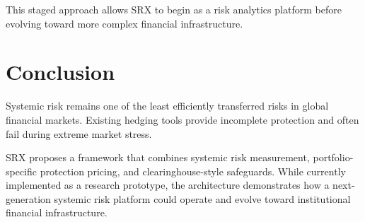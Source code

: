\documentclass[11pt]{article}
\begin{document}
This staged approach allows SRX to begin as a risk analytics platform before evolving toward more complex financial infrastructure.

\section{Conclusion}

Systemic risk remains one of the least efficiently transferred risks in global financial markets. Existing hedging tools provide incomplete protection and often fail during extreme market stress.

SRX proposes a framework that combines systemic risk measurement, portfolio-specific protection pricing, and clearinghouse-style safeguards. While currently implemented as a research prototype, the architecture demonstrates how a next-generation systemic risk platform could operate and evolve toward institutional financial infrastructure.
\end{document}
